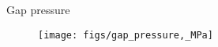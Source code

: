 \begin{frame}{Gap pressure}

    \scriptsize

    \begin{figure}[h]
        \texttt{[image: figs/gap\_pressure,\_MPa]}
    \end{figure}

\end{frame}